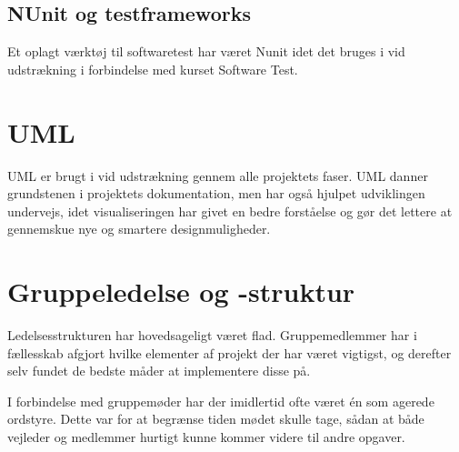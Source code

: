 \subsection{NUnit og testframeworks}
Et oplagt værktøj til softwaretest har været Nunit idet det bruges i vid udstrækning i forbindelse med kurset Software Test.

\section{UML}
UML er brugt i vid udstrækning gennem alle projektets faser. UML danner grundstenen i projektets dokumentation, men har også hjulpet udviklingen undervejs, idet visualiseringen har givet en bedre forståelse og gør det lettere at gennemskue nye og smartere designmuligheder.

\section{Gruppeledelse og -struktur}
Ledelsesstrukturen har hovedsageligt været flad. Gruppemedlemmer har i fællesskab afgjort hvilke elementer af projekt der har været vigtigst, og derefter selv fundet de bedste måder at implementere disse på.

I forbindelse med gruppemøder har der imidlertid ofte været én som agerede ordstyre. Dette var for at begrænse tiden mødet skulle tage, sådan at både vejleder og medlemmer hurtigt kunne kommer videre til andre opgaver.